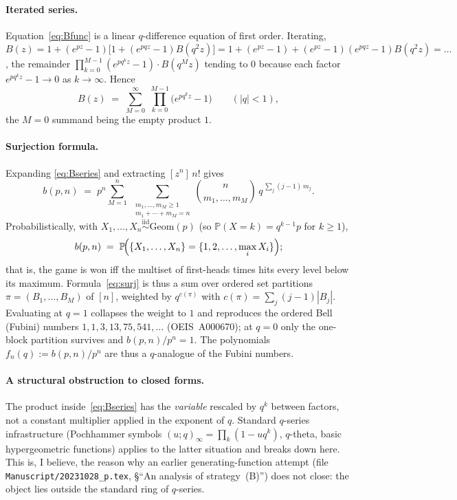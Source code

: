 \documentclass[11pt]{article}
\theoremstyle{definition}
\renewcommand{\P}{\mathbb{P}}
\begin{document}
\paragraph{Iterated series.} Equation~\eqref{eq:Bfunc} is a linear
$q$-difference equation of first order. Iterating,
$B(z) = 1 + (e^{pz}-1)\bigl[1 + (e^{pqz}-1)B(q^2z)\bigr] = 1 +
(e^{pz}-1) + (e^{pz}-1)(e^{pqz}-1)B(q^2z) = \ldots$, the remainder
$\prod_{k=0}^{M-1}(e^{pq^kz}-1)\cdot B(q^Mz)$ tending to $0$ because
each factor $e^{pq^kz}-1\to 0$ as $k\to\infty$. Hence
\begin{equation}\label{eq:Bseries}
  B(z) \;=\; \sum_{M=0}^{\infty}\;\prod_{k=0}^{M-1}\bigl(e^{p q^k z}-1\bigr)
  \qquad (|q|<1),
\end{equation}
the $M=0$ summand being the empty product $1$.

\paragraph{Surjection formula.} Expanding \eqref{eq:Bseries} and
extracting $[z^n]\,n!$ gives
\begin{equation}\label{eq:surj}
  b(p,n) \;=\; p^n\sum_{M=1}^{n}\;
  \sum_{\substack{m_1,\dots,m_M\ge 1\\ m_1+\cdots+m_M=n}}
  \binom{n}{m_1,\ldots,m_M}\,q^{\,\sum_{j}(j-1)\,m_j}.
\end{equation}
Probabilistically, with $X_1,\ldots,X_n\stackrel{\text{iid}}{\sim}\mathrm{Geom}(p)$ (so
$\P(X=k)=q^{k-1}p$ for $k\ge 1$),
\begin{equation}\label{eq:prob-interp}
  b(p,n) \;=\; \P\!\Bigl(\{X_1,\ldots,X_n\}=\{1,2,\ldots,\max_iX_i\}\Bigr);
\end{equation}
that is, the game is won iff the multiset of first-heads times hits
every level below its maximum. Formula~\eqref{eq:surj} is thus a sum
over ordered set partitions $\pi=(B_1,\ldots,B_M)$ of $[n]$, weighted
by $q^{c(\pi)}$ with $c(\pi)=\sum_{j}(j-1)|B_j|$. Evaluating at $q=1$
collapses the weight to $1$ and reproduces the ordered Bell
(Fubini) numbers $1,1,3,13,75,541,\ldots$ (OEIS~A000670); at $q=0$ only
the one-block partition survives and $b(p,n)/p^n=1$. The polynomials
$f_n(q):=b(p,n)/p^n$ are thus a $q$-analogue of the Fubini numbers.

\paragraph{A structural obstruction to closed forms.} The product
inside~\eqref{eq:Bseries} has the \emph{variable} rescaled by $q^k$
between factors, not a constant multiplier applied in the exponent of
$q$. Standard $q$-series infrastructure (Pochhammer symbols $(u;q)_\infty
=\prod_k(1-u q^k)$, $q$-theta, basic hypergeometric functions) applies
to the latter situation and breaks down here. This is, I believe, the
reason why an earlier generating-function attempt (file
\texttt{Manuscript/20231028\_p.tex}, \S``An analysis of strategy~(B)'')
does not close: the object lies outside the standard ring of $q$-series.
\end{document}
